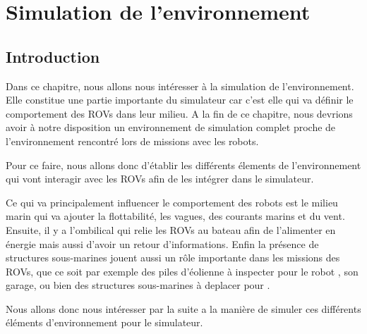 \chapter{Simulation de l'environnement}
\label{chapitre:environnement}
	
	\section{Introduction}

		Dans ce chapitre, nous allons nous intéresser à la simulation de l'environnement. Elle constitue une partie importante du simulateur car c'est elle qui va définir le comportement des \gls{ROV}s dans leur milieu.  A la fin de ce chapitre, nous devrions avoir à notre disposition un environnement de simulation complet proche de l'environnement rencontré lors de missions avec les robots.

		Pour ce faire, nous allons donc d'établir les différents élements de l'environnement qui vont interagir avec les \gls{ROV}s afin de les intégrer dans le simulateur. 
		
		Ce qui va principalement influencer le comportement des robots est le milieu marin qui va ajouter la flottabilité, les vagues, des courants marins et du vent. Ensuite, il y a l'ombilical qui relie les \gls{ROV}s au bateau afin de l'alimenter en énergie mais aussi d'avoir un retour d'informations. Enfin la présence de structures sous-marines jouent aussi un rôle importante dans les missions des \gls{ROV}s, que ce soit par exemple des piles d'éolienne à inspecter pour le robot \argos{}, son garage, ou bien des structures sous-marines à deplacer pour \atoll{}.

		Nous allons donc nous intéresser par la suite a la manière de simuler ces différents éléments d'environnement pour le simulateur.



